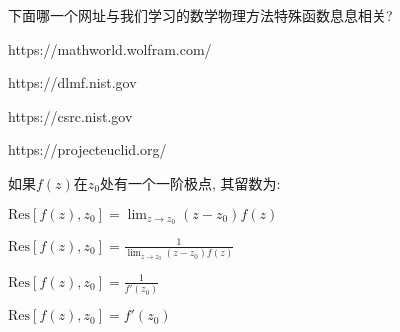 \documentclass{njustexam}
\begin{document}






\begin{problem}
  下面哪一个网址与我们学习的数学物理方法特殊函数息息相关? 
  \begin{abcd}
    \item https://mathworld.wolfram.com/
    \item https://dlmf.nist.gov
    \item https://csrc.nist.gov
    \item https://projecteuclid.org/
  \end{abcd}

\end{problem}

\begin{problem}
  如果$f(z)$在$z_0$处有一个一阶极点, 其留数为:
\begin{abcd}
  \item $\text{Res}[f(z),  z_0] = \lim_{z \to z_0} (z - z_0)f(z)$
  \item $\text{Res}[f(z),  z_0] = \frac{1}{\lim_{z \to z_0} (z - z_0)f(z)}$
  \item $\text{Res}[f(z),  z_0] = \frac{1}{f'(z_0)}$
  \item $\text{Res}[f(z),  z_0] = f'(z_0)$
\end{abcd}
\end{problem}







\end{document}
